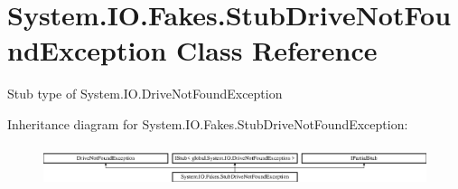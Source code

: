 \hypertarget{class_system_1_1_i_o_1_1_fakes_1_1_stub_drive_not_found_exception}{\section{System.\-I\-O.\-Fakes.\-Stub\-Drive\-Not\-Found\-Exception Class Reference}
\label{class_system_1_1_i_o_1_1_fakes_1_1_stub_drive_not_found_exception}
}


Stub type of System.\-I\-O.\-Drive\-Not\-Found\-Exception 


Inheritance diagram for System.\-I\-O.\-Fakes.\-Stub\-Drive\-Not\-Found\-Exception\-:\begin{figure}[H]
\begin{center}
\leavevmode
\includegraphics[height=1.196581cm]{class_system_1_1_i_o_1_1_fakes_1_1_stub_drive_not_found_exception}
\end{center}
\end{figure}
